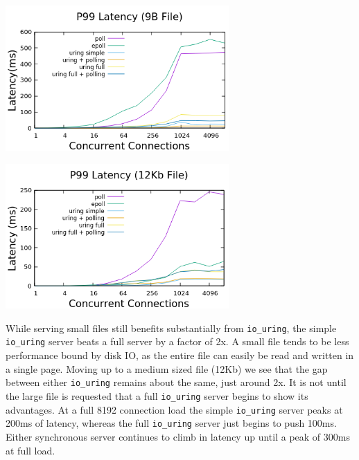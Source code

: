 \documentclass[letterpaper, 10pt, twocolumn]{article}
\begin{document}
\begin{center}
\includegraphics[width=3.35in]{small_latency.png}
\end{center}

\begin{center}
\includegraphics[width=3.35in]{./med_latency.png}
\end{center}

While serving small files still benefits substantially from \texttt{io\_uring}, the simple \texttt{io\_uring} server beats a full server by a factor of 2x. A small file tends to be less performance bound by disk IO, as the entire file can easily be read and written in a single page. Moving up to a medium sized file (12Kb) we see that the gap between either \texttt{io\_uring} remains about the same, just around 2x. It is not until the large file is requested that a full \texttt{io\_uring} server begins to show its advantages. At a full 8192 connection load the simple \texttt{io\_uring} server peaks at 200ms of latency, whereas the full \texttt{io\_uring} server just begins to push 100ms. Either synchronous server continues to climb in latency up until a peak of 300ms at full load.
\end{document}
